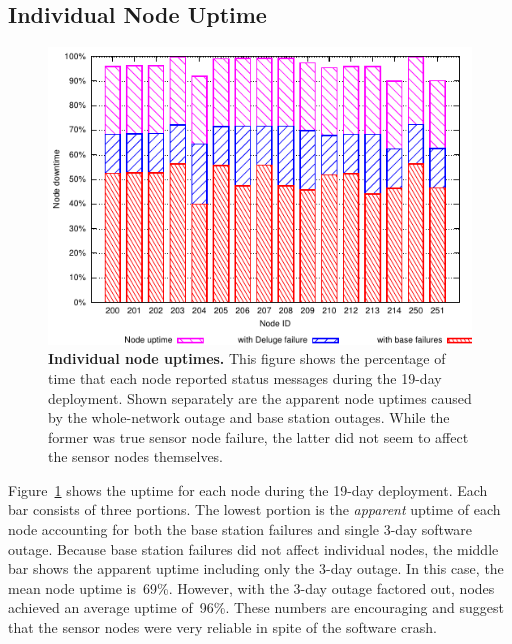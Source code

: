 \subsection{Individual Node Uptime}

\begin{figure}[t]
\begin{center}
\includegraphics[width=\hsize]{./3-evaluation/figs/nodeuptime.pdf}
\end{center}

\caption{\textbf{Individual node uptimes.} This figure shows the percentage
of time that each node reported status messages during the 19-day deployment.
Shown separately are the apparent node uptimes caused by the whole-network
outage and base station outages. While the former was true sensor node
failure, the latter did not seem to affect the sensor nodes themselves.}

\label{evaluation-fig-nodeuptime}
\end{figure}

Figure~\ref{evaluation-fig-nodeuptime} shows the uptime for each node during
the 19-day deployment. Each bar consists of three portions. The lowest
portion is the \textit{apparent} uptime of each node accounting for both the
base station failures and single 3-day software outage. Because base station
failures did not affect individual nodes, the middle bar shows the apparent
uptime including only the 3-day outage. In this case, the mean node uptime
is~69\%. However, with the 3-day outage factored out, nodes achieved an
average uptime of~96\%. These numbers are encouraging and suggest that the
sensor nodes were very reliable in spite of the software crash.

